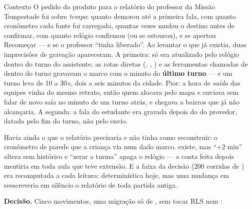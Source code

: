 \begin{especificacao}{Contexto}
O pedido do produto para o relatório do professor da Missão Tempestade foi
sobre \emph{tempo}: quanto demorou até a primeira fala, com quanto cronômetro
cada fonte foi carregada, quantas vezes mudou o destino antes de confirmar, com
quanto relógio confirmou (ou se estourou), e se apertou Recomeçar --- e se o
professor \enquote{tinha liberado}. Ao levantar o que já existia, duas
imprecisões de gravação apareceram. A primeira: 
só era atualizado pelo relógio dentro do turno do assistente; as rotas diretas
(, , ) e as ferramentas chamadas
de dentro do turno gravavam o marco com o minuto do \textbf{último turno} ---
e um turno leva de 10 a 30\,s, dois a seis minutos da cidade. Pior: a hora de
\emph{saída} das equipes vinha do mesmo retrato, então quem alocava pelo mapa e
enviava sem falar de novo saía no minuto de um turno atrás, e chegava a bairros
que já não alcançaria. A segunda: a fala do estudante era gravada depois do
 do provedor, datada pelo fim do turno, não pelo envio.

Havia ainda o que o relatório precisaria e não tinha como reconstruir: o
cronômetro de parede que a criança via num dado marco.  existe,
mas \enquote{+2 min} altera  sem histórico e \enquote{zerar a
turma} apaga o relógio --- a conta feita depois mentiria em toda aula que teve
extensão. E a faixa da decisão (200 corridas de ) era
recomputada a cada leitura: determinística hoje, mas uma mudança em
 reescreveria em silêncio o relatório de toda partida antiga.
\end{especificacao}

\textbf{Decisão.} Cinco movimentos, uma migração só de , sem tocar
RLS nem :

